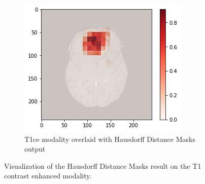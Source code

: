 \begin{figure}[H]
\begin{subfigure}[t]{.315\textwidth}
    \end{subfigure}\hfill%
    \begin{subfigure}[t]{.315\textwidth}
        \centering
        \includegraphics[width=\linewidth]{chapters/07_brats3d/images/10_t1ce_hdm.png}
        \caption{T1ce modality overlaid with Hausdorff Distance Masks output}
    \end{subfigure}
    \caption{Visualization of the Hausdorff Distance Masks result on the T1 contrast enhanced modality.}
    \label{brats3d_t1ce}
\end{figure}

